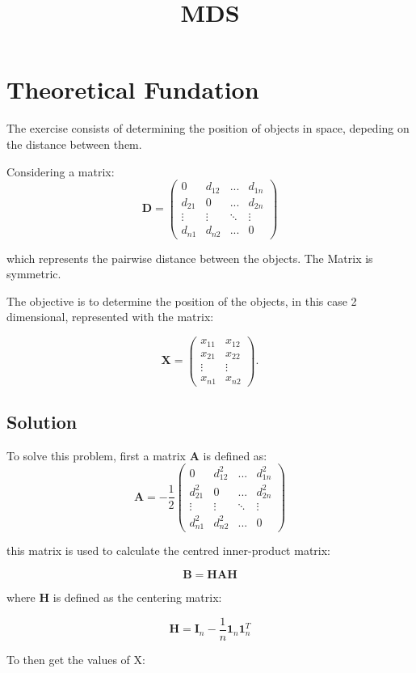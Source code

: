 \documentclass[a4paper,12pt]{article}
\title{MDS}
\begin{document}
\section{Theoretical Fundation}
The exercise consists of determining the position of objects in space,
depeding on the distance between them.

Considering a matrix:
\begin{equation}
\bm{D} = 
\begin{pmatrix}
0 & d_{12} & ... & d_{1n} \\
d_{21} & 0 & ... & d_{2n} \\
\vdots & \vdots & \ddots & \vdots \\
d_{n1} & d_{n2} & ... & 0    
\end{pmatrix}
\end{equation}

which represents the pairwise distance between the objects. The Matrix is 
symmetric.

The objective is to determine the position of the objects, in this case 2 dimensional, represented
with the matrix:

\begin{equation}
\bm{X} = 
\begin{pmatrix}
x_{11} & x_{12} \\
x_{21} & x_{22} \\
\vdots & \vdots \\
x_{n1} & x_{n2}
\end{pmatrix}.
\end{equation}


\subsection{Solution}
To solve this problem,
first a matrix $\bm{A}$ is defined as:
\begin{equation}
\bm{A} =-\frac{1}{2} 
\begin{pmatrix}
0 & d_{12}^2 & ... & d_{1n}^2 \\
d_{21}^2 & 0 & ... & d_{2n}^2 \\
\vdots & \vdots & \ddots & \vdots \\
d_{n1}^2 & d_{n2}^2 & ... & 0    
\end{pmatrix}
\end{equation}


this matrix is used to calculate the centred inner-product matrix:


\begin{equation}
    \bm{B} = \bm{HAH}
\end{equation}

where $\bm{H}$ is defined as the centering matrix:

\begin{equation}
    \bm{H} = \bm{I}_n - \frac{1}{n}\bm{1}_n\bm{1}_n^T
\end{equation}


To then get the values of X:
\end{document}

